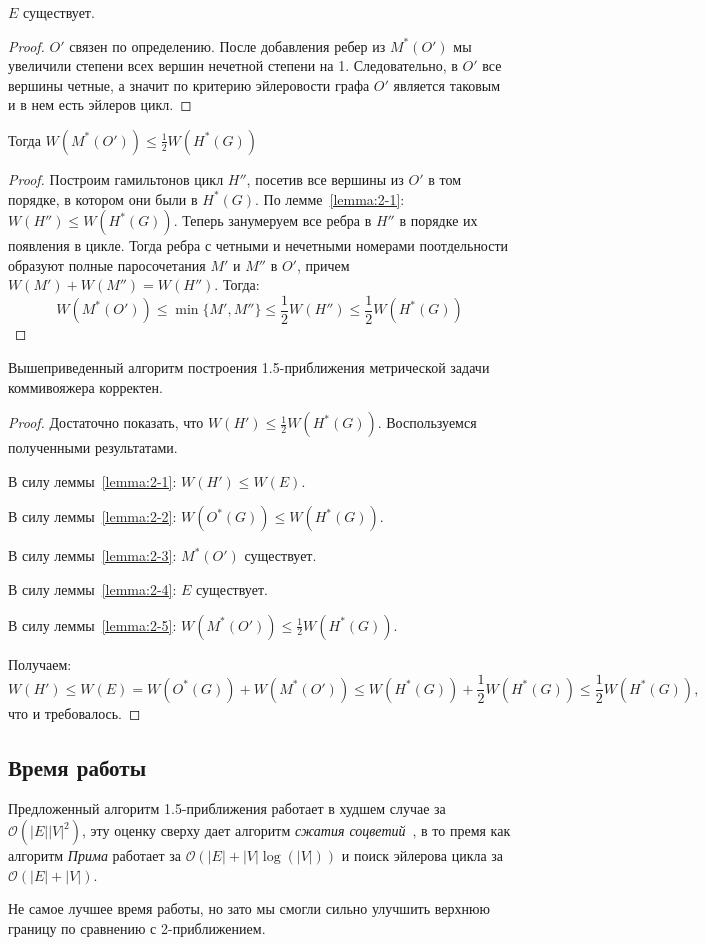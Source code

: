 \begin{lemma}
    \label{lemma:2-4}
    $E$ существует.
\end{lemma}
\begin{proof}
    $O'$ связен по определению.
    После добавления ребер из $M^*(O')$ мы увеличили степени всех вершин нечетной степени на 1.
    Следовательно, в $O'$ все вершины четные, а значит по критерию эйлеровости графа $O'$ является таковым и в нем есть эйлеров цикл.
\end{proof}

\begin{lemma}
    \label{lemma:2-5}
    Тогда $W(M^*(O')) \leq \frac12 W(H^*(G))$
\end{lemma}
\begin{proof}
    Построим гамильтонов цикл $H''$, посетив все вершины из $O'$ в том порядке, в котором они были в $H^*(G)$.
    По лемме~\ref{lemma:2-1}: $W(H'') \leq W(H^*(G))$.
    Теперь занумеруем все ребра в $H''$ в порядке их появления в цикле.
    Тогда ребра с четными и нечетными номерами поотдельности образуют полные паросочетания $M'$ и $M''$ в $O'$, причем $W(M') + W(M'') = W(H'')$.
    Тогда:
    $$W(M^*(O')) \leq \min\{M', M''\} \leq \frac12 W(H'') \leq \frac12 W(H^*(G))$$
\end{proof}

\begin{theorem}
    \label{theorem:2-2}
    Вышеприведенный алгоритм построения 1.5-приближения метрической задачи коммивояжера корректен.
\end{theorem}
\begin{proof}
    Достаточно показать, что $W(H') \leq \frac12 W(H^*(G))$. Воспользуемся полученными результатами.

    В силу леммы~\ref{lemma:2-1}: $W(H') \leq W(E)$.

    В силу леммы~\ref{lemma:2-2}: $W(O^*(G)) \leq W(H^*(G))$.

    В силу леммы~\ref{lemma:2-3}: $M^*(O')$ существует.

    В силу леммы~\ref{lemma:2-4}: $E$ существует.

    В силу леммы~\ref{lemma:2-5}: $W(M^*(O')) \leq \frac12 W(H^*(G))$.

    Получаем:
    $$W(H') \leq W(E) = W(O^*(G)) + W(M^*(O')) \leq W(H^*(G)) + \frac12 W(H^*(G)) \leq \frac12 W(H^*(G)),$$
    что и требовалось.
\end{proof}

\subsection*{Время работы}

Предложенный алгоритм 1.5-приближения работает в худшем случае за $\mathcal{O}(|E||V|^2)$,
эту оценку сверху дает алгоритм \textit{сжатия соцветий}~\cite{shoemaker2016blossom},
в то премя как алгоритм \textit{Прима} работает за $\mathcal{O}(|E| + |V| \log (|V|))$ и
поиск эйлерова цикла за $\mathcal{O}(|E| + |V|)$.

Не самое лучшее время работы, но зато мы смогли сильно улучшить верхнюю границу по сравнению с 2-приближением.
